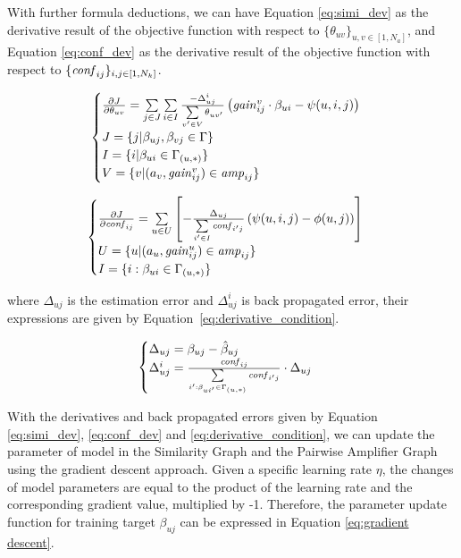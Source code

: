 With further formula deductions, we can have Equation
\ref{eq:simi_dev} as the derivative result of the objective function
with respect to $\{\theta_{uv}\}_{u,v\in[1,N_a]}$, and Equation
\ref{eq:conf_dev} as the derivative result of the objective function
with respect to $\{\mathit{conf}_{ij}\}_{i,j\in[1,N_k]}$.

\begin{equation}
  \label{eq:simi_dev}
  \begin{cases}
    \pa{J}{\theta_{uv}}=\sum\limits_{j\in J} \sum\limits_{i\in I} \frac{-\Delta_{uj}^{i}}{\sum \limits_{v'\in V} \theta_{{u}{v'}}}  \left(\gain{v}{ij}\cdot\beta_{ui}- \psi(u,i,j)\right) \\
    J=\{j|\beta_{uj},\beta_{vj}\in\Gamma\} \\
    I=\{i|\beta_{ui}\in\Gamma_{(u,*)}\} \\
    V=\{v|(a_{v},\gain{{v}}{ij})\in \amp{ij}\}
  \end{cases}
\end{equation}

\begin{equation}
  \label{eq:conf_dev}
  \begin{cases}
    \pa{J}{\confi{ij}}=\sum\limits_{u\in U} \left[ -\frac{\Delta_{uj}}{\sum\limits_{i'\in I} \confi{{i'}{j}}} \left(\psi(u,i,j) - \phi(u,j)\right) \right] \\
    U=\{u|(a_u,\gain{u}{ij})\in\amp{ij}\} \\
    I=\{i:\beta_{{u}{i}}\in\Gamma_{({u},*)}\}
  \end{cases}
\end{equation}

where $\Delta_{uj}$ is the estimation error and $\Delta_{uj}^{i}$ is
back propagated error, their expressions are given by
Equation~\ref{eq:derivative_condition}.

\begin{equation}
  \label{eq:derivative_condition}
  \begin{cases}
    \Delta_{uj}=\beta_{uj}-\hat{\beta}_{uj}\\
    \Delta_{uj}^{i}=\frac{\confi{ij}}{\sconf{u}{i'}{j}}\cdot \Delta_{uj}
  \end{cases}
\end{equation}

With the derivatives and back propagated errors given by Equation
\ref{eq:simi_dev}, \ref{eq:conf_dev} and
\ref{eq:derivative_condition}, we can update the parameter of {\sppan}
model in the Similarity Graph and the Pairwise Amplifier Graph using
the gradient descent approach. Given a specific learning rate $\eta$,
the changes of model parameters are equal to the product of the
learning rate and the corresponding gradient value, multiplied by
-1. Therefore, the parameter update function for training target
$\beta_{uj}$ can be expressed in Equation \ref{eq:gradient descent}.

